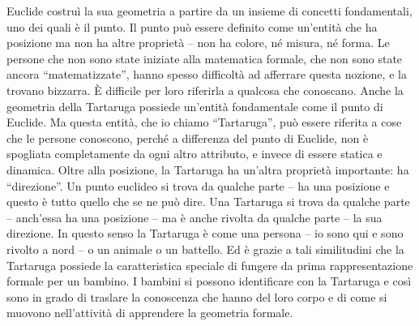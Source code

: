 Euclide costruì la sua geometria a partire da un insieme di concetti fondamentali, uno dei quali è il punto. Il punto può essere definito come un'entità che ha posizione ma non ha altre proprietà – non ha colore, né misura, né forma. Le persone che non sono state iniziate alla matematica formale, che non sono state ancora “matematizzate”, hanno spesso difficoltà ad afferrare questa nozione, e la trovano bizzarra. È difficile per loro riferirla a qualcosa che conoscano. Anche la geometria della Tartaruga possiede un'entità fondamentale come il punto di Euclide. Ma questa entità, che io chiamo “Tartaruga”, può essere riferita a cose che le persone conoscono, perché a differenza del punto di Euclide, non è spogliata completamente da ogni altro attributo, e invece di essere statica e dinamica. Oltre alla posizione, la Tartaruga ha un'altra proprietà importante: ha “direzione”. Un punto euclideo si trova da qualche parte – ha una posizione e questo è tutto quello che se ne può dire. Una Tartaruga si trova da qualche parte – anch'essa ha una posizione – ma è anche rivolta da qualche parte – la sua direzione. In questo senso la Tartaruga è come una persona – io sono qui e sono rivolto a nord – o un animale o un battello. Ed è grazie a tali similitudini che la Tartaruga possiede la caratteristica speciale di fungere da prima rappresentazione formale per un bambino. I bambini si possono identificare con la Tartaruga e così sono in grado di traslare la conoscenza che hanno del loro corpo e di come si muovono nell'attività di apprendere la geometria formale.

